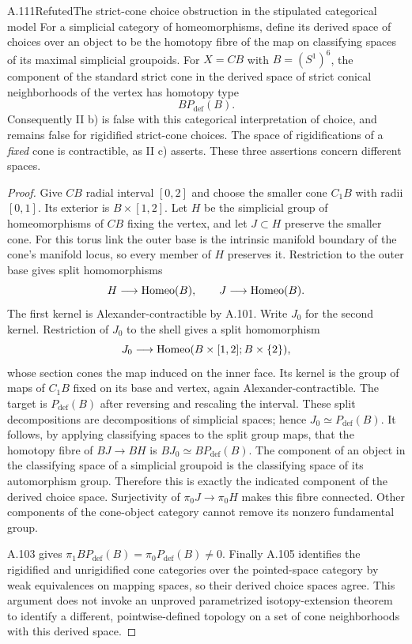 \begin{saresult}{A.111}{Refuted}{The strict-cone choice obstruction in the stipulated categorical model}
For a simplicial category of homeomorphisms, define its derived space
of choices over an object to be the homotopy fibre of the map on
classifying spaces of its maximal simplicial groupoids. For
$X=C B$ with $B=(S^1)^6$, the component of the standard strict cone
in the derived space of strict conical neighborhoods of the vertex
has homotopy type
\[
 BP_{\mathrm{def}}(B).
\]
Consequently II b) is false with this categorical interpretation of
choice, and remains false for rigidified strict-cone choices. The
space of rigidifications of a \emph{fixed} cone is contractible, as
II c) asserts. These three assertions concern different spaces.
\end{saresult}
\begin{proof}
Give $CB$ radial interval $[0,2]$ and choose the smaller cone
$C_1B$ with radii $[0,1]$. Its exterior is $B\times[1,2]$.
Let $H$ be the simplicial group of homeomorphisms of $CB$ fixing
the vertex, and let $J\subset H$ preserve the smaller cone.
For this torus link the outer base is the intrinsic manifold boundary
of the cone's manifold locus, so every member of $H$ preserves it.
Restriction to the outer base gives split homomorphisms
\[
 H\longrightarrow\operatorname{Homeo}(B),\qquad
 J\longrightarrow\operatorname{Homeo}(B).
\]
The first kernel is Alexander-contractible by A.101. Write $J_0$
for the second kernel. Restriction of $J_0$ to the shell gives a
split homomorphism
\[
 J_0\longrightarrow
 \operatorname{Homeo}(B\times[1,2];B\times\{2\}),
\]
whose section cones the map induced on the inner face. Its kernel
is the group of maps of $C_1B$ fixed on its base and vertex, again
Alexander-contractible. The target is $P_{\mathrm{def}}(B)$ after
reversing and rescaling the interval. These split decompositions are
decompositions of simplicial spaces; hence $J_0\simeq P_{\mathrm{def}}(B)$.
It follows, by applying classifying spaces to the split group maps,
that the homotopy fibre of $BJ\to BH$ is $BJ_0\simeq BP_{\mathrm{def}}(B)$.
The component of an object in the classifying space of a simplicial
groupoid is the classifying space of its automorphism group. Therefore
this is exactly the indicated component of the derived choice space.
Surjectivity of $\pi_0J\to\pi_0H$ makes this fibre connected. Other
components of the cone-object category cannot remove its nonzero
fundamental group.

A.103 gives $\pi_1BP_{\mathrm{def}}(B)=\pi_0P_{\mathrm{def}}(B)\ne0$.
Finally A.105 identifies the rigidified and unrigidified cone categories
over the pointed-space category by weak equivalences on mapping spaces,
so their derived choice spaces agree. This argument does not invoke an
unproved parametrized isotopy-extension theorem to identify a different,
pointwise-defined topology on a set of cone neighborhoods with this
derived space.
\end{proof}

